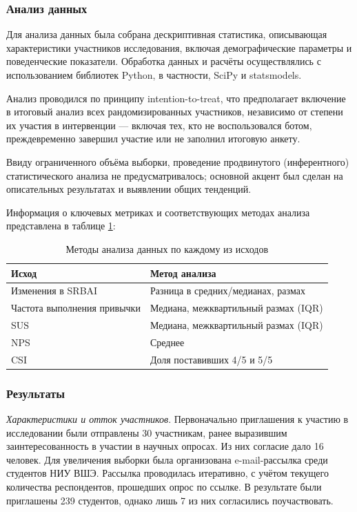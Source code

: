 \documentclass[pdflatex,sn-mathphys-num]{sn-jnl}%
\theoremstyle{thmstyleone}%
\theoremstyle{thmstyletwo}%
\theoremstyle{thmstylethree}%
\begin{document}
\subsubsection{Анализ данных}

Для анализа данных была собрана дескриптивная статистика, описывающая характеристики участников исследования, включая демографические параметры и поведенческие показатели. Обработка данных и расчёты осуществлялись с использованием библиотек Python, в частности, SciPy и statsmodels.

Анализ проводился по принципу intention-to-treat, что предполагает включение в итоговый анализ всех рандомизированных участников, независимо от степени их участия в интервенции — включая тех, кто не воспользовался ботом, преждевременно завершил участие или не заполнил итоговую анкету.

Ввиду ограниченного объёма выборки, проведение продвинутого (инферентного) статистического анализа не предусматривалось; основной акцент был сделан на описательных результатах и выявлении общих тенденций.

Информация о ключевых метриках и соответствующих методах анализа представлена в таблице \ref{tab:rct_outcomes}:

\begin{table}[h!]
\normalsize
\centering
\caption{Методы анализа данных по каждому из исходов}
\label{tab:rct_outcomes}
\begin{tabular}{|p{5cm}|p{8cm}|}
\hline
\textbf{Исход} & \textbf{Метод анализа} \\
\hline
Изменения в SRBAI & Разница в средних/медианах, размах \\
\hline
Частота выполнения привычки & Медиана, межквартильный размах (IQR) \\
\hline 
SUS & Медиана, межквартильный размах (IQR) \\
\hline 
NPS & Среднее \\
\hline  
CSI & Доля поставивших 4/5 и 5/5 \\
\hline
\end{tabular}
\end{table}

\subsubsection{Результаты}

\textit{Характеристики и отток участников}. Первоначально приглашения к участию в исследовании были отправлены 30 участникам, ранее выразившим заинтересованность в участии в научных опросах. Из них согласие дало 16 человек. Для увеличения выборки была организована e-mail-рассылка среди студентов НИУ ВШЭ. Рассылка проводилась итеративно, с учётом текущего количества респондентов, прошедших опрос по ссылке. В результате были приглашены 239 студентов, однако лишь 7 из них согласились поучаствовать. 
\end{document}
